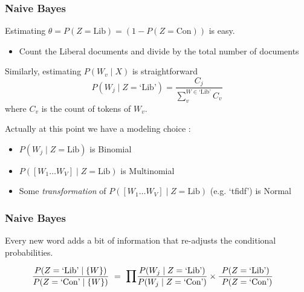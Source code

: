 \documentclass{hertieteaching}
\begin{document}
\begin{frame}[t,fragile]\frametitle{Naive Bayes}

Estimating $\theta = P(Z = \text{Lib}) = (1 - P(Z = \text{Con}))$ is easy. 
\begin{itemize}
  \item Count the Liberal documents and divide by the total number of documents
\end{itemize}

Similarly, estimating $P(W_v \mid X)$ is straightforward
$$
P(W_j \mid Z = \text{`Lib'}) = \frac{C_j}{\sum^{W \in \text{`Lib'}}_v C_v}
$$
where $C_v$ is the count of tokens of $W_v$.

Actually at this point we have a modeling choice \parencite{McCallum.Nigam1993}:
\begin{itemize}
  \item $P(W_j \mid Z = \text{Lib})$ is Binomial
  \item $P([W_1 \ldots W_V] \mid Z = \text{Lib})$ is Multinomial
  \item Some \textit{transformation} of $P([W_1 \ldots W_V] \mid Z = \text{Lib})$ (e.g. `tfidf') is Normal
\end{itemize}

\end{frame}
\begin{frame}[t,fragile]\frametitle{Naive Bayes}



Every new word adds a bit of information that re-adjusts the conditional probabilities.

\begin{align*}
\frac{P(Z=\text{{`Lib'}} \mid \{W\})}
{P(Z=\text{`Con'} \mid \{W\})} & ~=~ 
\mathlarger{\prod} \frac{P(W_j \mid Z=\text{\text{`Lib'}})}
{P(W_j \mid Z=\text{`Con'})}\times \frac{P(Z=\text{\text{`Lib'}})}{~P(Z=\text{`Con'})}
\end{align*}



\end{frame}



\end{document}
